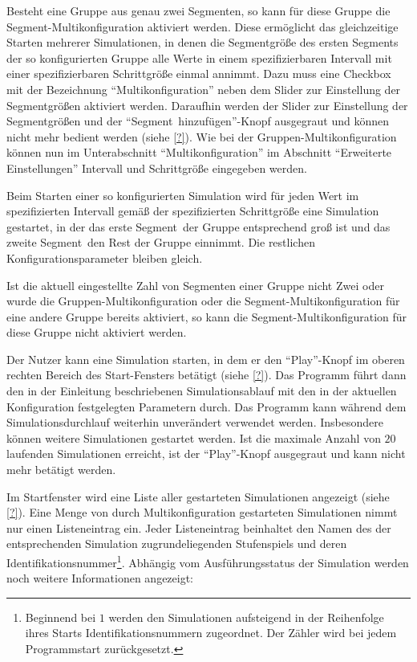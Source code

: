\documentclass[parskip=full,11pt]{scrartcl}
\def\segment{Segment}
\def\segments{Segmente}
\begin{document}
\functionality{Multikonfiguration von \segments n}{fnc:multikonfseg}
Besteht eine Gruppe aus genau zwei \segments n, so kann für diese Gruppe die \segment -Multikonfiguration aktiviert werden. Diese ermöglicht das gleichzeitige Starten mehrerer Simulationen, in denen die \segment größe des ersten \segment s der so konfigurierten Gruppe alle Werte in einem spezifizierbaren Intervall mit einer spezifizierbaren Schrittgröße einmal annimmt. Dazu muss eine Checkbox mit der Bezeichnung \enquote{Multikonfiguration} neben dem Slider zur Einstellung der \segment größen aktiviert werden. Daraufhin werden der Slider zur Einstellung der \segment größen und der \enquote{\segment\ hinzufügen}-Knopf ausgegraut und können nicht mehr bedient werden (siehe \cref{?}). Wie bei der Gruppen-Multikonfiguration können nun im Unterabschnitt \enquote{Multikonfiguration} im Abschnitt \enquote{Erweiterte Einstellungen} Intervall und Schrittgröße eingegeben werden.

Beim Starten einer so konfigurierten Simulation wird für jeden Wert im spezifizierten Intervall gemäß der spezifizierten Schrittgröße eine Simulation gestartet, in der das erste \segment\ der Gruppe entsprechend groß ist und das zweite \segment\ den Rest der Gruppe einnimmt. Die restlichen Konfigurationsparameter bleiben gleich.

Ist die aktuell eingestellte Zahl von \segments n einer Gruppe nicht Zwei oder wurde die Gruppen-Multikonfiguration oder die \segment -Multikonfiguration für eine andere Gruppe bereits aktiviert, so kann die \segment -Multikonfiguration für diese Gruppe nicht aktiviert werden.

Der Nutzer kann eine Simulation starten, in dem er den \enquote{Play}-Knopf im oberen rechten Bereich des Start-Fensters betätigt (siehe \cref{?}). Das Programm führt dann den in der Einleitung beschriebenen Simulationsablauf mit den in der aktuellen Konfiguration festgelegten Parametern durch. Das Programm kann während dem Simulationsdurchlauf weiterhin unverändert verwendet werden. Insbesondere können weitere Simulationen gestartet werden. Ist die maximale Anzahl von \(20\) laufenden Simulationen erreicht, ist der \enquote{Play}-Knopf ausgegraut und kann nicht mehr betätigt werden.

Im Startfenster wird eine Liste aller gestarteten Simulationen angezeigt (siehe \cref{?}). Eine Menge von durch Multikonfiguration gestarteten Simulationen nimmt nur einen Listeneintrag ein. Jeder Listeneintrag beinhaltet den Namen des der entsprechenden Simulation zugrundeliegenden Stufenspiels und deren Identifikationsnummer\footnote{Beginnend bei \(1\) werden den Simulationen aufsteigend in der Reihenfolge ihres Starts Identifikationsnummern zugeordnet. Der Zähler wird bei jedem Programmstart zurückgesetzt.}. Abhängig vom Ausführungsstatus der Simulation werden noch weitere Informationen angezeigt:
\end{document}
